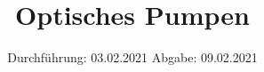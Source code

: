 

\subject{V21}
\title{Optisches Pumpen}
\date{%
  Durchführung: 03.02.2021
  \hspace{3em}
  Abgabe: 09.02.2021
}



\maketitle
\thispagestyle{empty}
\tableofcontents
\newpage






\printbibliography{}


